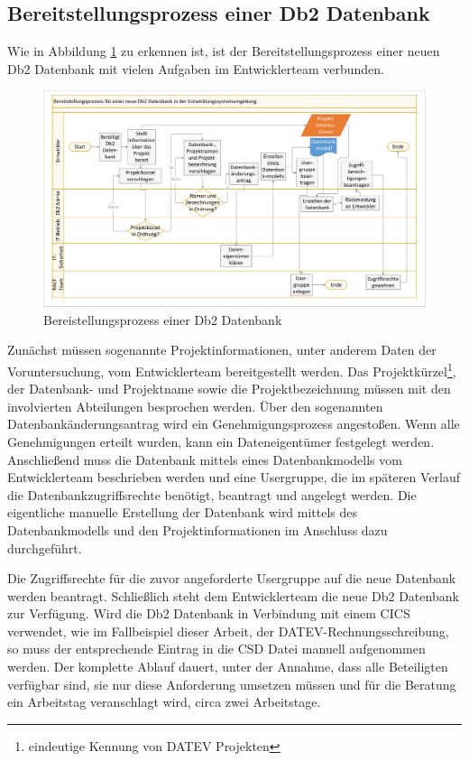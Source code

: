 \subsection{Bereitstellungsprozess einer Db2 Datenbank}
Wie in Abbildung \ref{fig:aktdb2} zu erkennen ist, ist der Bereitstellungsprozess einer neuen Db2 Datenbank mit vielen Aufgaben im Entwicklerteam verbunden.
\begin{figure}[ht!]
\centering
\includegraphics[width=\paperwidth,angle=90]{figures/swimlaneDb2.pdf}
\caption{Bereistellungsprozess einer Db2 Datenbank}
\label{fig:aktdb2}
\end{figure}
Zunächst müssen sogenannte Projektinformationen, unter anderem Daten der Voruntersuchung, vom Entwicklerteam bereitgestellt werden.
Das Projektkürzel\footnote{eindeutige Kennung von DATEV Projekten}, der Datenbank- und Projektname sowie die Projektbezeichnung müssen mit den involvierten Abteilungen besprochen werden.
Über den sogenannten \glqq Datenbankänderungsantrag\grqq{} wird ein Genehmigungsprozess angestoßen.
Wenn alle Genehmigungen erteilt wurden, kann ein Dateneigentümer festgelegt werden.
Anschließend muss die Datenbank mittels eines Datenbankmodells vom Entwicklerteam beschrieben werden und eine Usergruppe, die im späteren Verlauf die Datenbankzugriffsrechte benötigt, beantragt und angelegt werden.
Die eigentliche manuelle Erstellung der Datenbank wird mittels des Datenbankmodells und den Projektinformationen im Anschluss dazu durchgeführt.

Die Zugriffsrechte für die zuvor angeforderte Usergruppe auf die neue Datenbank werden beantragt.
Schließlich steht dem Entwicklerteam die neue Db2 Datenbank zur Verfügung.
Wird die Db2 Datenbank in Verbindung mit einem CICS verwendet, wie im Fallbeispiel dieser Arbeit, der DATEV-Rechnungsschreibung, so muss der entsprechende Eintrag in die CSD Datei manuell aufgenommen werden. 
Der komplette Ablauf dauert, unter der Annahme, dass alle Beteiligten verfügbar sind, sie nur diese Anforderung umsetzen müssen und für die Beratung ein Arbeitstag veranschlagt wird, circa zwei Arbeitstage.

